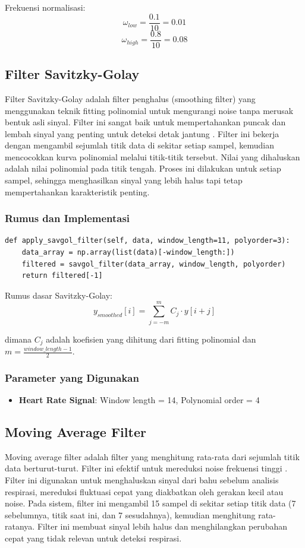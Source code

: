 \documentclass[11pt,a4paper]{article}
\begin{document}
Frekuensi normalisasi:
$$\omega_{low} = \frac{0.1}{10} = 0.01$$
$$\omega_{high} = \frac{0.8}{10} = 0.08$$


\subsection{Filter Savitzky-Golay}
Filter Savitzky-Golay adalah filter penghalus (smoothing filter) yang menggunakan teknik fitting polinomial untuk mengurangi noise tanpa merusak bentuk asli sinyal. Filter ini sangat baik untuk mempertahankan puncak dan lembah sinyal yang penting untuk deteksi detak jantung \cite{savitzky1964}.
Filter ini bekerja dengan mengambil sejumlah titik data di sekitar setiap sampel, kemudian mencocokkan kurva polinomial melalui titik-titik tersebut. Nilai yang dihaluskan adalah nilai polinomial pada titik tengah. Proses ini dilakukan untuk setiap sampel, sehingga menghasilkan sinyal yang lebih halus tapi tetap mempertahankan karakteristik penting.

\subsubsection{Rumus dan Implementasi}
    \begin{lstlisting}
def apply_savgol_filter(self, data, window_length=11, polyorder=3):
    data_array = np.array(list(data)[-window_length:])
    filtered = savgol_filter(data_array, window_length, polyorder)
    return filtered[-1]
    \end{lstlisting}

Rumus dasar Savitzky-Golay:
$$y_{smoothed}[i] = \sum_{j=-m}^{m} C_j \cdot y[i+j]$$

dimana $C_j$ adalah koefisien yang dihitung dari fitting polinomial dan $m = \frac{window\_length-1}{2}$.

\subsubsection{Parameter yang Digunakan}
\begin{itemize}
    \item \textbf{Heart Rate Signal}: Window length = 14, Polynomial order = 4
\end{itemize}

\subsection{Moving Average Filter}
Moving average filter adalah filter yang menghitung rata-rata dari sejumlah titik data berturut-turut. Filter ini efektif untuk mereduksi noise frekuensi tinggi \cite{smith1997} . Filter ini digunakan untuk menghaluskan sinyal dari bahu sebelum analisis respirasi, mereduksi fluktuasi cepat yang diakbatkan oleh gerakan kecil atau noise. Pada sistem, filter ini mengambil 15 sampel di sekitar setiap titik data (7 sebelumnya, titik saat ini, dan 7 sesudahnya), kemudian menghitung rata-ratanya. Filter ini membuat sinyal lebih halus dan menghilangkan perubahan cepat yang tidak relevan untuk deteksi respirasi.
\end{document}
